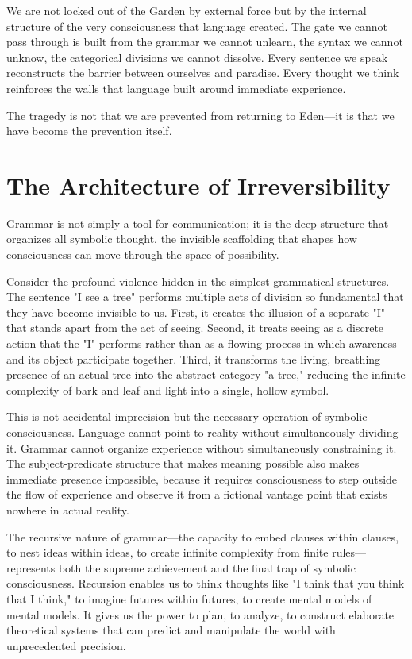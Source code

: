 We are not locked out of the Garden by external force but by the internal structure of the very consciousness that language created. The gate we cannot pass through is built from the grammar we cannot unlearn, the syntax we cannot unknow, the categorical divisions we cannot dissolve. Every sentence we speak reconstructs the barrier between ourselves and paradise. Every thought we think reinforces the walls that language built around immediate experience.

The tragedy is not that we are prevented from returning to Eden—it is that we have become the prevention itself.

\section{The Architecture of Irreversibility}

Grammar is not simply a tool for communication; it is the deep structure that organizes all symbolic thought, the invisible scaffolding that shapes how consciousness can move through the space of possibility.

Consider the profound violence hidden in the simplest grammatical structures. The sentence "I see a tree" performs multiple acts of division so fundamental that they have become invisible to us. First, it creates the illusion of a separate "I" that stands apart from the act of seeing. Second, it treats seeing as a discrete action that the "I" performs rather than as a flowing process in which awareness and its object participate together. Third, it transforms the living, breathing presence of an actual tree into the abstract category "a tree," reducing the infinite complexity of bark and leaf and light into a single, hollow symbol.

This is not accidental imprecision but the necessary operation of symbolic consciousness. Language cannot point to reality without simultaneously dividing it. Grammar cannot organize experience without simultaneously constraining it. The subject-predicate structure that makes meaning possible also makes immediate presence impossible, because it requires consciousness to step outside the flow of experience and observe it from a fictional vantage point that exists nowhere in actual reality.

The recursive nature of grammar—the capacity to embed clauses within clauses, to nest ideas within ideas, to create infinite complexity from finite rules—represents both the supreme achievement and the final trap of symbolic consciousness. Recursion enables us to think thoughts like "I think that you think that I think," to imagine futures within futures, to create mental models of mental models. It gives us the power to plan, to analyze, to construct elaborate theoretical systems that can predict and manipulate the world with unprecedented precision.

